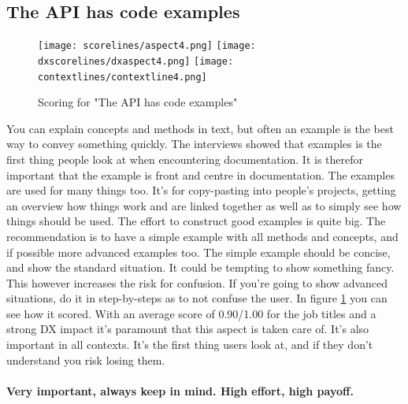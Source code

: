 \documentclass{cslthse-msc}
\begin{document}
    \subsection{The API has code examples}\label{hascodeexamples}
    \begin{figure}[H]
        \centering
        \texttt{[image: scorelines/aspect4.png]}
        \texttt{[image: dxscorelines/dxaspect4.png]}
        \texttt{[image: contextlines/contextline4.png]}
        \caption{Scoring for "The API has code examples"}
        \label{fig:aspect4}
    \end{figure}
    You can explain concepts and methods in text, but often an example is the best way to convey something quickly. The interviews showed that examples is the first thing people look at when encountering documentation. It is therefor important that the example is front and centre in documentation. The examples are used for many things too. It's for copy-pasting into people's projects, getting an overview how things work and are linked together as well as to simply see how things should be used. The effort to construct good examples is quite big. The recommendation is to  have a simple example with all methods and concepts, and if possible more advanced examples too. The simple example should be concise, and show the standard situation. It could be tempting to show something fancy. This however increases the risk for confusion. If you're going to show advanced situations, do it in step-by-steps as to not confuse the user. In figure \ref{fig:aspect4} you can see how it scored. With an average score of 0.90/1.00 for the job titles and a strong DX impact it's paramount that this aspect is taken care of. It's also important in all contexts. It's the first thing users look at, and if they don't understand you risk losing them. \\ \\
    \textbf{Very important, always keep in mind. High effort, high payoff.}
\end{document}
